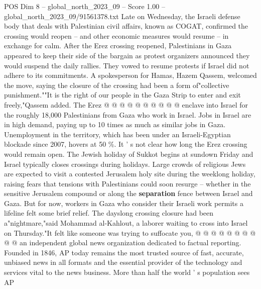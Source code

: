 \begin{textsample}{POS Dim 8 – global\_north\_2023\_09 – Score 1.00 – global\_north\_2023\_09/91561378.txt}
Late on Wednesday, the Israeli defense body that deals with Palestinian civil affairs, known as COGAT, confirmed the crossing would reopen -- and other economic measures would resume -- in exchange for calm.
After the Erez crossing reopened, Palestinians in Gaza appeared to keep their side of the bargain as protest organizers announced they would suspend the daily rallies.
They vowed to resume protests if Israel did not adhere to its commitments.
A spokesperson for Hamas, Hazem Qassem, welcomed the move, saying the closure of the crossing had been a form of"collective punishment.""It is the right of our people in the Gaza Strip to enter and exit freely,"Qassem added.
The Erez @ @ @ @ @ @ @ @ @ @ enclave into Israel for the roughly 18,000 Palestinians from Gaza who work in Israel.
Jobs in Israel are in high demand, paying up to 10 times as much as similar jobs in Gaza.
Unemployment in the territory, which has been under an Israeli-Egyptian blockade since 2007, hovers at 50 \%.
It ' s not clear how long the Erez crossing would remain open.
The Jewish holiday of Sukkot begins at sundown Friday and Israel typically closes crossings during holidays.
Large crowds of religious Jews are expected to visit a contested Jerusalem holy site during the weeklong holiday, raising fears that tensions with Palestinians could soon resurge -- whether in the sensitive Jerusalem compound or along the \textbf{separation} fence between Israel and Gaza.
But for now, workers in Gaza who consider their Israeli work permits a lifeline felt some brief relief.
The dayslong crossing closure had been a"nightmare,"said Mohammad al-Kahlout, a laborer waiting to cross into Israel on Thursday."It felt like someone was trying to suffocate you, @ @ @ @ @ @ @ @ @ @ an independent global news organization dedicated to factual reporting.
Founded in 1846, AP today remains the most trusted source of fast, accurate, unbiased news in all formats and the essential provider of the technology and services vital to the news business.
More than half the world ' s population sees AP

\end{textsample}
